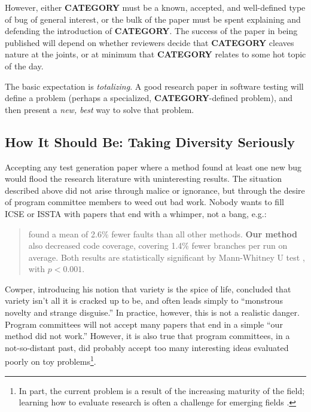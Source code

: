 \documentclass[sigplan,screen]{acmart}
\begin{document}
However, either {\bf CATEGORY} must be a known, accepted, and
well-defined type of bug of general interest, or the bulk of the paper
must be spent explaining and defending the introduction of {\bf
  CATEGORY}.  The success of the paper in being published will depend
on whether reviewers decide that {\bf CATEGORY} cleaves nature at the
joints, or at minimum that {\bf CATEGORY} relates to some hot topic of
the day.

The basic expectation is \emph{totalizing}.  A good research paper in
software testing will define a problem (perhaps a specialized, {\bf
  CATEGORY}-defined problem), and then present a \emph{new, best} way
to solve that problem.

\subsection{How It Should Be: Taking Diversity Seriously}

Accepting any test generation paper where a method found at least one
new bug would flood the research literature with uninteresting
results.  The situation described above did not arise through malice
or ignorance, but through the desire of program committee members to
weed out bad work.  Nobody wants to fill ICSE or ISSTA with papers
that end with a whimper, not a bang, e.g.:

\begin{quote}
 found a mean of 2.6\% fewer faults than all
other methods.  {\bf Our
  method} also decreased code coverage, covering 1.4\% fewer branches
per run on average.  Both results are statistically significant by
Mann-Whitney U test \cite{arcuri2014hitchhiker}, with $p < 0.001$.
\end{quote}

Cowper, introducing his notion that variety is the spice of life,
concluded that variety isn't all it is cracked up to be, and often
leads simply to ``monstrous novelty and strange disguise.''  In
practice, however, this is not a realistic danger.  Program committees
will not accept many papers that end in a simple ``our method did not
work.''  However, it is also true that program committees, in a
not-so-distant past, did probably accept too many interesting ideas
evaluated poorly on toy problems\footnote{In part, the current problem is a
result of the increasing maturity of the field; learning how to evaluate research
is often a challenge for emerging fields \cite{10.1145/1294211.1294256}.}.
\end{document}
